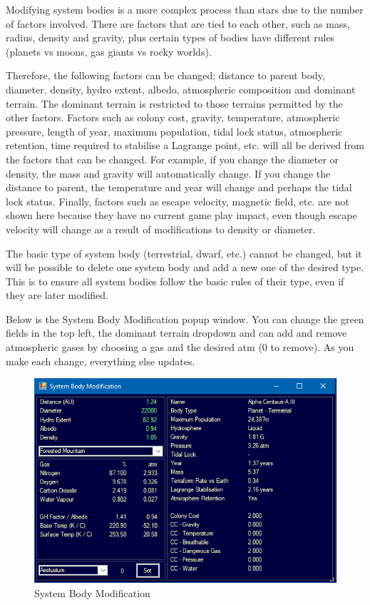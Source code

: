 \documentclass[../Aurora C# unofficial manual.tex]{subfiles}
\begin{document}
	Modifying system bodies is a more complex process than stars due to the number of factors involved. There are factors that are tied to each other, such as mass, radius, density and gravity, plus certain types of bodies have different rules (planets vs moons, gas giants vs rocky worlds).
	
	Therefore, the following factors can be changed; distance to parent body, diameter, density, hydro extent, albedo, atmospheric composition and dominant terrain. The dominant terrain is restricted to those terrains permitted by the other factors. Factors such as colony cost, gravity, temperature, atmospheric pressure, length of year, maximum population, tidal lock status, atmospheric retention, time required to stabilise a Lagrange point, etc. will all be derived from the factors that can be changed. For example, if you change the diameter or density, the mass and gravity will automatically change. If you change the distance to parent, the temperature and year will change and perhaps the tidal lock status. Finally, factors such as escape velocity, magnetic field, etc. are not shown here because they have no current game play impact, even though escape velocity will change as a result of modifications to density or diameter.
	
	The basic type of system body (terrestrial, dwarf, etc.) cannot be changed, but it will be possible to delete one system body and add a new one of the desired type. This is to ensure all system bodies follow the basic rules of their type, even if they are later modified.
	
	Below is the System Body Modification popup window. You can change the green fields in the top left, the dominant terrain dropdown and can add and remove atmospheric gases by choosing a gas and the desired atm (0 to remove). As you make each change, everything else updates.
	\begin{figure}[H]
		\centering
		\includegraphics[width=0.5\linewidth]{images/SystemBodyModification}
		\caption[System Body Modification]{System Body Modification}
		\label{fig:systembodymodification}
	\end{figure}
	
\end{document}
